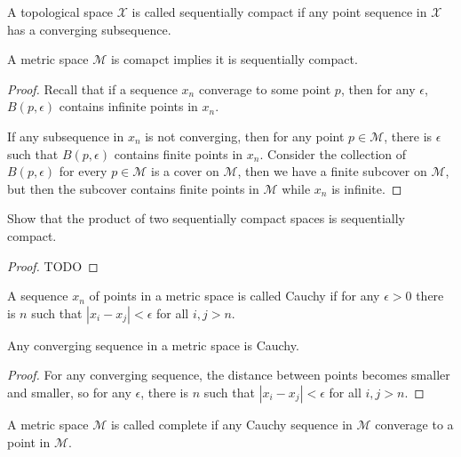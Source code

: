 \documentclass[./main.tex]{subfiles}
\begin{document}
\begin{definition}
  A topological space $\mathcal{X}$ is called sequentially compact if any
  point sequence in $\mathcal{X}$ has a converging subsequence.
\end{definition}

\begin{theorem}
  A metric space $\mathcal{M}$ is comapct implies it is sequentially compact.
\end{theorem}
\begin{proof}
  Recall that if a sequence $x_n$ converage to some point $p$, then
  for any $\epsilon$, $B(p, \epsilon)$ contains infinite points in $x_n$.

  If any subsequence in $x_n$ is not converging, then for any point $p \in \mathcal{M}$,
  there is $\epsilon$ such that $B(p, \epsilon)$ contains finite points in $x_n$.
  Consider the collection of $B(p, \epsilon)$ for every $p \in \mathcal{M}$
  is a cover on $\mathcal{M}$, then we have a finite subcover on $\mathcal{M}$,
  but then the subcover contains finite points in $\mathcal{M}$
  while $x_n$ is infinite.
\end{proof}

\begin{theorem}
  Show that the product of two sequentially compact spaces is sequentially compact.
\end{theorem}
\begin{proof}
  TODO
\end{proof}

\begin{definition}
  A sequence $x_n$ of points in a metric space is called Cauchy if for any
  $\epsilon > 0$ there is $n$ such that $|x_i - x_j| < \epsilon$ for all $i, j > n$.
\end{definition}

\begin{theorem}
  Any converging sequence in a metric space is Cauchy.
\end{theorem}
\begin{proof}
  For any converging sequence, the distance between points becomes smaller and smaller,
  so for any $\epsilon$, there is $n$ such that $|x_i - x_j| < \epsilon$ for all $i, j > n$.
\end{proof}

\begin{definition}
  A metric space $\mathcal{M}$ is called complete if any Cauchy sequence in $\mathcal{M}$ converage to a point in $\mathcal{M}$.
\end{definition}
\end{document}
